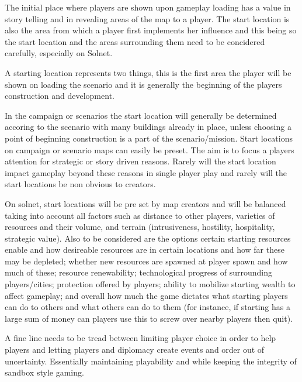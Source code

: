 
The initial place where players are shown upon gameplay loading has a value in story telling and in revealing areas of the map to a player. The start location is also the area from which a player first implements her influence and this being so the start location and the areas surrounding them need to be concidered carefully, especially on Solnet.

A starting location represents two things, this is the first area the player will be shown on loading the scenario and it is generally the beginning of the players construction and development.  

In the campaign or scenarios the start location will generally be determined accoring to the scenario with many buildings already in place, unless choosing a point of beginning construction is a part of the scenario/mission. Start locations on campaign or scenario maps can easily be preset. The aim is to focus a players attention for strategic or story driven reasons. Rarely will the start location impact gameplay beyond these reasons in single player play and rarely will the start locations be non obvious to creators.

On solnet, start locations will be pre set by map creators and will be balanced taking into account all factors such as distance to other players, varieties of resources and their volume, and terrain (intrusiveness, hostility, hospitality, strategic value). Also to be considered are the options certain starting resources enable and how desireable resources are in certain locations and how far these may be depleted; whether new resources are spawned at player spawn and how much of these; resource renewability; technological progress of surrounding players/cities; protection offered by players; ability to mobilize starting wealth to affect gameplay; and overall how much the game dictates what starting players can do to others and what others can do to them (for instance, if starting has a large sum of money can players use this to screw over nearby players then quit).

A fine line needs to be tread between limiting player choice in order to help players and letting players and diplomacy create events and order out of uncertainty. Essentially maintaining playability and while keeping the integrity of sandbox style gaming.


